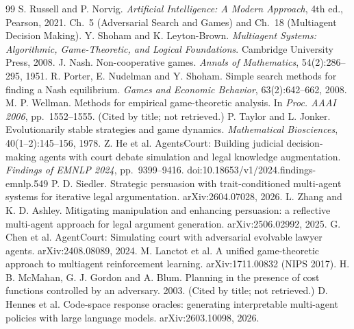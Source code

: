 \begin{thebibliography}{99}\small
{} S. Russell and P. Norvig. \emph{Artificial Intelligence: A Modern Approach}, 4th ed., Pearson, 2021. Ch.~5 (Adversarial Search and Games) and Ch.~18 (Multiagent Decision Making).
 Y. Shoham and K. Leyton-Brown. \emph{Multiagent Systems: Algorithmic, Game-Theoretic, and Logical Foundations}. Cambridge University Press, 2008.
 J. Nash. Non-cooperative games. \emph{Annals of Mathematics}, 54(2):286--295, 1951.
 R. Porter, E. Nudelman and Y. Shoham. Simple search methods for finding a Nash equilibrium. \emph{Games and Economic Behavior}, 63(2):642--662, 2008.
 M. P. Wellman. Methods for empirical game-theoretic analysis. In \emph{Proc. AAAI 2006}, pp.~1552--1555. (Cited by title; not retrieved.)
 P. Taylor and L. Jonker. Evolutionarily stable strategies and game dynamics. \emph{Mathematical Biosciences}, 40(1--2):145--156, 1978.
 Z. He et al. AgentsCourt: Building judicial decision-making agents with court debate simulation and legal knowledge augmentation. \emph{Findings of EMNLP 2024}, pp.~9399--9416. doi:10.18653/v1/2024.findings-emnlp.549
 P. D. Siedler. Strategic persuasion with trait-conditioned multi-agent systems for iterative legal argumentation. arXiv:2604.07028, 2026.
 L. Zhang and K. D. Ashley. Mitigating manipulation and enhancing persuasion: a reflective multi-agent approach for legal argument generation. arXiv:2506.02992, 2025.
 G. Chen et al. AgentCourt: Simulating court with adversarial evolvable lawyer agents. arXiv:2408.08089, 2024.
 M. Lanctot et al. A unified game-theoretic approach to multiagent reinforcement learning. arXiv:1711.00832 (NIPS 2017).
 H. B. McMahan, G. J. Gordon and A. Blum. Planning in the presence of cost functions controlled by an adversary. 2003. (Cited by title; not retrieved.)
 D. Hennes et al. Code-space response oracles: generating interpretable multi-agent policies with large language models. arXiv:2603.10098, 2026.
\end{thebibliography}
